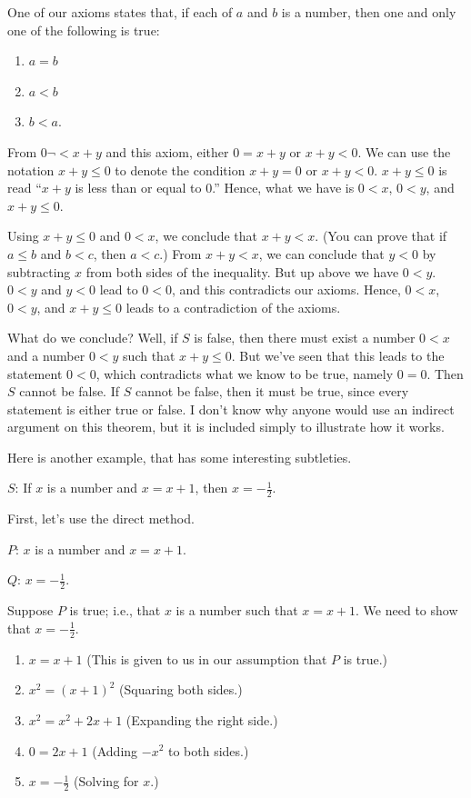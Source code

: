 \documentclass[english]{book}
\begin{document}
One of our axioms states that, if each of $a$ and $b$ is a number, then one and only one of the following is true: 
\begin{enumerate}[\hspace{1cm}1)]
  \item $a = b$
  \item $a < b$
  \item $b < a$.
\end{enumerate}
From $0 \neg < x+y$ and this axiom, either $0 = x+y$ or $x+y < 0$. We can use the notation $x+y \leq 0$ to denote the condition $x+y = 0$ or $x+y < 0$. $x+y \leq 0$ is read ``$x+y$ is less than or equal to $0$.'' Hence, what we have is $0 < x$, $0 < y$, and $x+y \leq 0$.

Using $x+y \leq 0$ and $0 < x$, we conclude that $x+y < x$. (You can prove that if $a \leq b$ and $b < c$, then $a < c$.) From $x+y < x$, we can conclude that $y < 0$ by subtracting $x$ from both sides of the inequality. But up above we have $0 < y$. $0 < y$ and $y < 0$ lead to $0 < 0$, and this contradicts our axioms. Hence, $0 < x$, $0 < y$, and $x+y \leq 0$ leads to a contradiction of the axioms. 

What do we conclude? Well, if $S$ is false, then there must exist a number $0<x$ and a number $0<y$ such that $x+y \leq 0$. But we've seen that this leads to the statement $0<0$, which contradicts what we know to be true, namely $0=0$. Then $S$ cannot be false. If $S$ cannot be false, then it must be true, since every statement is either true or false. I don't know why anyone would use an indirect argument on this theorem, but it is included simply to illustrate how it works. 

Here is another example, that has some interesting subtleties. 

$S$: If $x$ is a number and $x=x+1$, then $x=-\frac{1}{2}$.

First, let's use the direct method.

$P$: $x$ is a number and $x=x+1$.

$Q$: $x=-\frac{1}{2}$.

Suppose $P$ is true; i.e., that $x$ is a number such that $x=x+1$. We need to show that $x= - \frac{1}{2}$.

\begin{enumerate}[\hspace{1cm}1)]
  \item $x=x+1$ (This is given to us in our assumption that $P$ is true.)
  \item $x^2=(x+1)^2$ (Squaring both sides.)
  \item $x^2=x^2+2x+1$ (Expanding the right side.)
  \item $0=2x+1$ (Adding $-x^2$ to both sides.)
  \item $x= - \frac{1}{2}$ (Solving for $x$.)
\end{enumerate}
\end{document}
